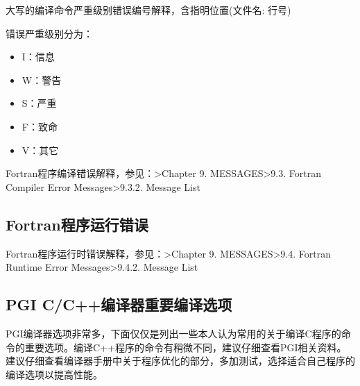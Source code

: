 \documentclass[a4paper,12pt,english]{sphinxmanual}
\begin{document}
\sphinxAtStartPar
大写的编译命令\sphinxhyphen{}严重级别\sphinxhyphen{}错误编号\sphinxhyphen{}解释，含指明位置(文件名: 行号)

\sphinxAtStartPar
错误严重级别分为：
\begin{itemize}
\item {} 
\sphinxAtStartPar
I：信息

\item {} 
\sphinxAtStartPar
W：警告

\item {} 
\sphinxAtStartPar
S：严重

\item {} 
\sphinxAtStartPar
F：致命

\item {} 
\sphinxAtStartPar
V：其它

\end{itemize}

\sphinxAtStartPar
Fortran程序编译错误解释，参见：\sphinxhyphen{}>Chapter
9. MESSAGES\sphinxhyphen{}>9.3. Fortran Compiler Error Messages\sphinxhyphen{}>9.3.2. Message List


\subsection{Fortran程序运行错误}
\label{\detokenize{compiler/pgi:fortran}}\label{\detokenize{compiler/pgi:fortran-1}}
\sphinxAtStartPar
Fortran程序运行时错误解释，参见：\sphinxhyphen{}>Chapter 9. MESSAGES\sphinxhyphen{}>9.4. Fortran Run\sphinxhyphen{}time Error Messages\sphinxhyphen{}>9.4.2. Message List


\subsection{PGI C/C++编译器重要编译选项}
\label{\detokenize{compiler/pgi:pgi-c-c}}
\sphinxAtStartPar
PGI编译器选项非常多，下面仅仅是列出一些本人认为常用的关于编译C程序的命令的重要选项。编译C++程序的命令有稍微不同，建议仔细查看PGI相关资料。建议仔细查看编译器手册中关于程序优化的部分，多加测试，选择适合自己程序的编译选项以提高性能。
\end{document}
